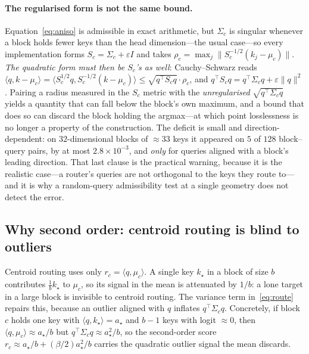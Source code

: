 \documentclass[11pt]{article}
\numberwithin{equation}{section}
\newcommand{\inner}[2]{\langle #1, #2\rangle}
\begin{document}
\paragraph{The regularised form is not the same bound.} Equation~\eqref{eq:aniso} is admissible in exact
arithmetic, but $\Sigma_c$ is singular whenever a block holds fewer keys than the head dimension---the
usual case---so every implementation forms $S_c=\Sigma_c+\varepsilon I$ and takes
$\rho_c=\max_j\lVert S_c^{-1/2}(k_j-\mu_c)\rVert$. \emph{The quadratic form must then be $S_c$'s as well}:
Cauchy--Schwarz reads $\inner{q}{k-\mu_c}=\inner{S_c^{1/2}q}{S_c^{-1/2}(k-\mu_c)}\le\sqrt{q^\top S_c q}\cdot\rho_c$,
and $q^\top S_c q = q^\top\Sigma_c q+\varepsilon\lVert q\rVert^2$. Pairing a radius measured in the
$S_c$ metric with the \emph{unregularised} $\sqrt{q^\top\Sigma_c q}$ yields a quantity that can fall below the
block's own maximum, and a bound that does so can discard the block holding the argmax---at which point
losslessness is no longer a property of the construction. The deficit is small and direction-dependent: on
$32$-dimensional blocks of $\approx 33$ keys it appeared on $5$ of $128$ block--query pairs, by at most
$2.8\times10^{-3}$, and \emph{only} for queries aligned with a block's leading direction. That last clause is
the practical warning, because it is the realistic case---a router's queries are not orthogonal to the keys
they route to---and it is why a random-query admissibility test at a single geometry does not detect the
error.

\subsection{Why second order: centroid routing is blind to outliers}\label{sec:secondorder}

Centroid routing uses only $r_c=\inner{q}{\mu_c}$. A single key $k_\star$ in a block of size $b$ contributes
$\tfrac1b k_\star$ to $\mu_c$, so its signal in the mean is attenuated by $1/b$: a lone target in a large block
is invisible to centroid routing. The variance term in~\eqref{eq:route} repairs this, because an outlier
aligned with $q$ inflates $q^\top\Sigma_c q$. Concretely, if block $c$ holds one key with
$\inner{q}{k_\star}=a_\star$ and $b-1$ keys with logit $\approx 0$, then $\inner{q}{\mu_c}\approx a_\star/b$ but
$q^\top\Sigma_c q\approx a_\star^2/b$, so the second-order score $r_c\approx a_\star/b+(\beta/2)a_\star^2/b$
carries the quadratic outlier signal the mean discards.
\end{document}
